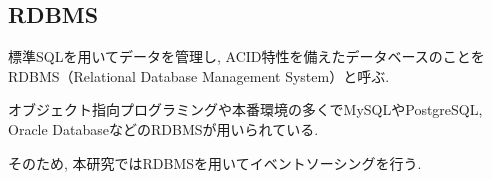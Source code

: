 \documentclass[../../../main]{subfiles}
\begin{document}
    \subsection{RDBMS}\label{subsec:phraseology-rdbms}

    標準SQLを用いてデータを管理し,  ACID特性を備えたデータベースのことをRDBMS（Relational Database Management System）と呼ぶ.

    オブジェクト指向プログラミングや本番環境の多くでMySQLやPostgreSQL, Oracle DatabaseなどのRDBMSが用いられている.

    そのため, 本研究ではRDBMSを用いてイベントソーシングを行う.
\end{document}
